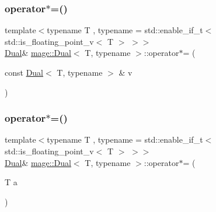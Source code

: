 \subsubsection{\texorpdfstring{operator$\ast$=()}{operator*=()}\hspace{0.1cm}{\footnotesize\ttfamily [1/2]}}
{\footnotesize\ttfamily template$<$typename T , typename  = std\+::enable\+\_\+if\+\_\+t$<$ std\+::is\+\_\+floating\+\_\+point\+\_\+v$<$ T $>$ $>$$>$ \\
\mbox{\hyperlink{structmage_1_1_dual}{Dual}}\& \mbox{\hyperlink{structmage_1_1_dual}{mage\+::\+Dual}}$<$ T, typename $>$\+::operator$\ast$= (\begin{DoxyParamCaption}\item[{const \mbox{\hyperlink{structmage_1_1_dual}{Dual}}$<$ T, typename $>$ \&}]{v }\end{DoxyParamCaption})\hspace{0.3cm}{\ttfamily [noexcept]}}

\mbox{\label{structmage_1_1_dual_a4e86b32a1990fd8401cb224267cd29c6}} 
\subsubsection{\texorpdfstring{operator$\ast$=()}{operator*=()}\hspace{0.1cm}{\footnotesize\ttfamily [2/2]}}
{\footnotesize\ttfamily template$<$typename T , typename  = std\+::enable\+\_\+if\+\_\+t$<$ std\+::is\+\_\+floating\+\_\+point\+\_\+v$<$ T $>$ $>$$>$ \\
\mbox{\hyperlink{structmage_1_1_dual}{Dual}}\& \mbox{\hyperlink{structmage_1_1_dual}{mage\+::\+Dual}}$<$ T, typename $>$\+::operator$\ast$= (\begin{DoxyParamCaption}\item[{T}]{a }\end{DoxyParamCaption})\hspace{0.3cm}{\ttfamily [noexcept]}}

\mbox{\label{structmage_1_1_dual_ad4d250c779d736134e11130967e0cf1c}} 
